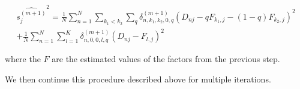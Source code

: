 \documentclass[12pt]{article}
\begin{document}
\begin{multline}
\widehat{s_{j}^{(m+1)}}^2 = \frac{1}{N}\sum_{n=1}^{N} \sum_{k_1 < k_2} \sum_{q} \delta^{(m+1)}_{n, k_1, k_2, 0, q} (D_{nj} - q F_{k_1,j} - (1-q) F_{k_2,j})^2 \\
+  \frac{1}{N}\sum_{n=1}^{N} \sum_{l=1}^{K} \delta^{(m+1)}_{n, 0, 0, l, q} (D_{nj} - F_{l,j} )^2
\end{multline}

where the $F$ are the estimated values of the factors from the previous step.

We then continue this procedure described above for multiple iterations.
\end{document}
